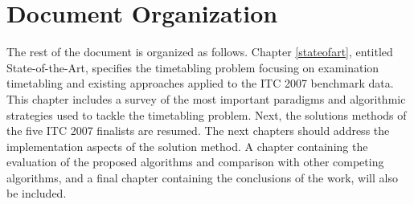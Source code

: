 
\section{Document Organization}

The rest of the document is organized as follows. Chapter \ref{stateofart}, entitled State-of-the-Art, specifies the timetabling problem focusing on examination timetabling and existing approaches applied to the ITC 2007 benchmark data. This chapter includes a survey of the most important paradigms and algorithmic strategies used to tackle the timetabling problem. Next, the solutions methods of the five ITC 2007 finalists are resumed. The next chapters should address the implementation aspects of the solution method. A chapter containing the evaluation of the proposed algorithms and comparison with other competing algorithms, and a final chapter containing the conclusions of the work, will also be included.